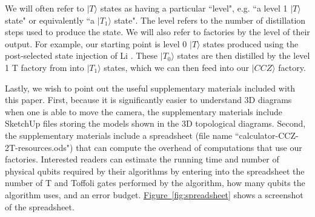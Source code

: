 \documentclass[superscriptaddress,notitlepage,longbibliography]{revtex4-1}
\newcommand{\fig}[1]{\hyperref[fig:#1]{Figure~\ref*{fig:#1}}}
\begin{document}
We will often refer to $|T\rangle$ states as having a particular ``level", e.g. ``a level 1 $|T\rangle$ state" or equivalently ``a $|T_1\rangle$ state".
The level refers to the number of distillation steps used to produce the state.
We will also refer to factories by the level of their output.
For example, our starting point is level 0 $|T\rangle$ states produced using the post-selected state injection of Li \cite{li2015}.
These $|T_0\rangle$ states are then distilled by the level 1 T factory from \cite{fowler2018} into $|T_1\rangle$ states, which we can then feed into our $|CCZ\rangle$ factory.

Lastly, we wish to point out the useful supplementary materials included with this paper.
First, because it is significantly easier to understand 3D diagrams when one is able to move the camera, the supplementary materials include SketchUp files storing the models shown in the 3D topological diagrams.
Second, the supplementary materials include a spreadsheet (file name ``calculator-CCZ-2T-resources.ods") that can compute the overhead of computations that use our factories.
Interested readers can estimate the running time and number of physical qubits required by their algorithms by entering into the spreadsheet the number of T and Toffoli gates performed by the algorithm, how many qubits the algorithm uses, and an error budget.
\fig{spreadsheet} shows a screenshot of the spreadsheet.
\end{document}
